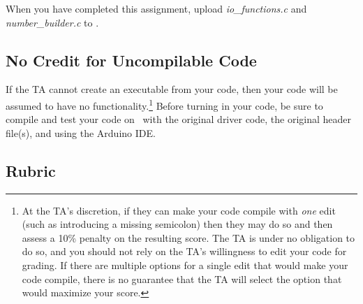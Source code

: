 When you have completed this assignment, upload \textit{io\_functions.c} and \textit{number\_builder.c} to
\filesubmission.

\subsection*{No Credit for Uncompilable Code}
If the TA cannot create an executable from your code, then your code will be assumed to have no functionality.\footnote{
    At the TA's discretion, if they can make your code compile with \textit{one} edit (such as introducing a missing semicolon) then they may do so and then assess a 10\% penalty on the resulting score.
    The TA is under no obligation to do so, and you should not rely on the TA's willingness to edit your code for grading.
    If there are multiple options for a single edit that would make your code compile, there is no guarantee that the TA will select the option that would maximize your score.
}
Before turning in your code, be sure to compile and test your code on \runtimeenvironment\ with the original driver code, the original header file(s), and using the Arduino IDE\@.

\pollinglablatepolicy

\subsection*{Rubric}

